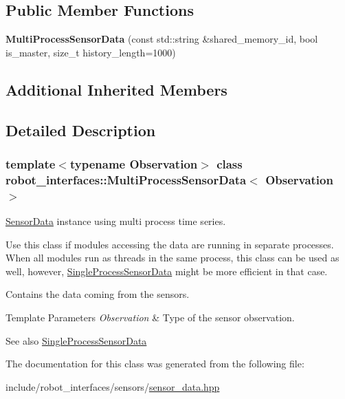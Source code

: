 \subsection*{Public Member Functions}
\begin{DoxyCompactItemize}
\item 
\mbox{\label{classrobot__interfaces_1_1MultiProcessSensorData_a8267ab3dc86230372571af2af73e07c0}} 
{\bfseries Multi\+Process\+Sensor\+Data} (const std\+::string \&shared\+\_\+memory\+\_\+id, bool is\+\_\+master, size\+\_\+t history\+\_\+length=1000)
\end{DoxyCompactItemize}
\subsection*{Additional Inherited Members}


\subsection{Detailed Description}
\subsubsection*{template$<$typename Observation$>$\newline
class robot\+\_\+interfaces\+::\+Multi\+Process\+Sensor\+Data$<$ Observation $>$}

\hyperlink{classrobot__interfaces_1_1SensorData}{Sensor\+Data} instance using multi process time series. 

Use this class if modules accessing the data are running in separate processes. When all modules run as threads in the same process, this class can be used as well, however, \hyperlink{classrobot__interfaces_1_1SingleProcessSensorData}{Single\+Process\+Sensor\+Data} might be more efficient in that case.

Contains the data coming from the sensors. 
\begin{DoxyTemplParams}{Template Parameters}
{\em Observation} & Type of the sensor observation. \\
\hline
\end{DoxyTemplParams}
\begin{DoxySeeAlso}{See also}
\hyperlink{classrobot__interfaces_1_1SingleProcessSensorData}{Single\+Process\+Sensor\+Data} 
\end{DoxySeeAlso}


The documentation for this class was generated from the following file\+:\begin{DoxyCompactItemize}
\item 
include/robot\+\_\+interfaces/sensors/\hyperlink{sensor__data_8hpp}{sensor\+\_\+data.\+hpp}\end{DoxyCompactItemize}
